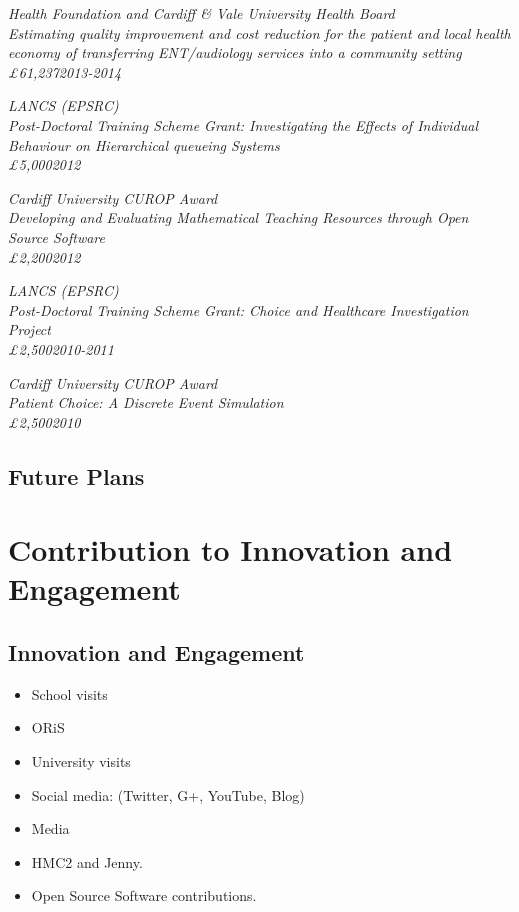 \documentclass{article}
\begin{document}
\sl{Health Foundation and Cardiff \& Vale University Health Board}\\
Estimating quality improvement and cost reduction for the patient and local health economy of transferring ENT/audiology services into a community setting\\
\pounds61,237\hfill{2013-2014}


\sl{LANCS (EPSRC)}\\
Post-Doctoral Training Scheme Grant: Investigating the Effects of Individual Behaviour on Hierarchical queueing Systems\\
\pounds5,000\hfill{2012}


\sl{Cardiff University CUROP Award}\\
Developing and Evaluating Mathematical Teaching Resources through Open Source Software\\
\pounds2,200\hfill{2012}

\sl{LANCS (EPSRC)}\\
Post-Doctoral Training Scheme Grant: Choice and Healthcare Investigation Project\\
\pounds2,500\hfill{2010-2011}

\sl{Cardiff University CUROP Award}\\
Patient Choice: A Discrete Event Simulation\\
\pounds2,500\hfill{2010}

\subsection{Future Plans}

\section{Contribution to Innovation and Engagement}\label{sec:innovation}

\subsection{Innovation and Engagement}

\begin{itemize}
    \item School visits
    \item ORiS
    \item University visits
    \item Social media: (Twitter, G+, YouTube, Blog)
    \item Media
    \item HMC2 and Jenny.
    \item Open Source Software contributions.
\end{itemize}
\end{document}
